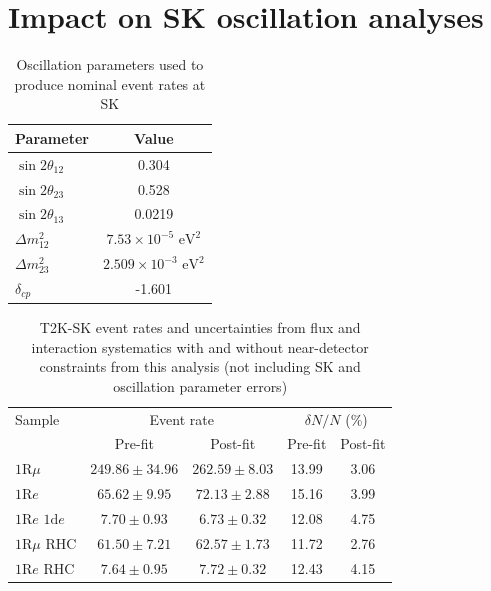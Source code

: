 \section{Impact on SK oscillation analyses}
\begin{table}
	\begin{tabular}{l | c}
		\hline
		\hline
		Parameter & Value \\
		\hline
		$\sin2\theta_{12}$ & 0.304 \\
		$\sin2\theta_{23}$ & 0.528 \\
		$\sin2\theta_{13}$ & 0.0219 \\
		$\Delta m^2_{12}$  & $7.53\times10^{-5} \text{ eV}^2$ \\
		$\Delta m^2_{23}$  & $2.509\times10^{-3} \text{ eV}^2$ \\
		$\delta_{cp}$ & -1.601 \\
		\hline
		\hline
	\end{tabular}
\caption{Oscillation parameters used to produce nominal event rates at SK}
\label{tab:osc_pars}
\end{table}

\begin{table}
	\begin{tabular}{l | c c | c c}
		\hline
		\hline
		Sample & \multicolumn{2}{c|}{Event rate} & \multicolumn{2}{c}{$\delta N/N$ (\%)} \\
		& Pre-fit & Post-fit & Pre-fit & Post-fit \\
		\hline
		$1\text{R}\mu$ & $249.86\pm34.96$ & $262.59\pm8.03$ & 13.99 & 3.06 \\
		$1\text{R}e$ & $65.62\pm9.95$ & $72.13\pm2.88$ & 15.16 &  3.99   \\
		$1\text{R}e \text{ 1d}e$ & $7.70\pm0.93$ & $6.73\pm0.32$ & 12.08 & 4.75  \\
		
		$1\text{R}\mu \text{ RHC}$ & $61.50\pm7.21$ & $62.57\pm1.73$ & 11.72 & 2.76 \\
		$1\text{R}e \text{ RHC}$ & $7.64\pm0.95$ & $7.72\pm0.32$ & 12.43 & 4.15  \\
		\hline
		\hline
	\end{tabular}
\caption{T2K-SK event rates and uncertainties from flux and interaction systematics with and without near-detector constraints from this analysis (not including SK and oscillation parameter errors)}
\label{tab:sk_evt_rates_2017}
\end{table}


